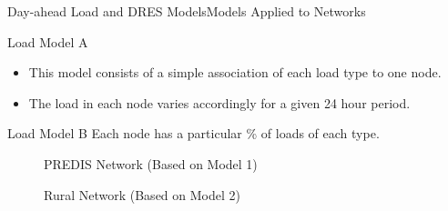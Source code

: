 \documentclass[xcolor=svgnames,aspectratio=32,8pt]{beamer}
\begin{document}
\begin{frame}
  {Day-ahead Load and DRES Models}{Models Applied to Networks}
  \vspace{0.3cm}
  \begin{changemargin}{-0.9cm}{-0.9cm} 
  \centering
  \begin{minipage}[!h]{0.45\paperwidth}

    \centering
    \begin{alertblock}{Load Model A}
    \begin{itemize}
      \item This model consists of a simple association of each load type to one node.
      \item The load in each node varies accordingly for a given 24 hour period.
    \end{itemize}
    \end{alertblock}

  \end{minipage}%
  \begin{minipage}[!h]{0.45\paperwidth}
    \centering
    \begin{block}{Load Model B}
    Each node has a particular \% of loads of each type.
    \begin{center}
    \end{center}
    \end{block}

  \end{minipage}
  \vspace{0.2cm} \pause

  \begin{minipage}[!h]{0.5\paperwidth}
    \begin{figure}[!h]
    \centering
    PREDIS Network (Based on Model 1)
    \setlength\figureheight{2cm}
    \setlength\figurewidth{0.4\paperwidth}
    
    \end{figure}
  \end{minipage}%
  \begin{minipage}[!h]{0.5\paperwidth}
    \begin{figure}[!h]
    Rural Network (Based on Model 2)
    \setlength\figureheight{2cm}
    \setlength\figurewidth{0.4\paperwidth}
    \hspace{-1cm}
    
    \end{figure}
  \end{minipage}


\end{changemargin}
\end{frame}
\end{document}
